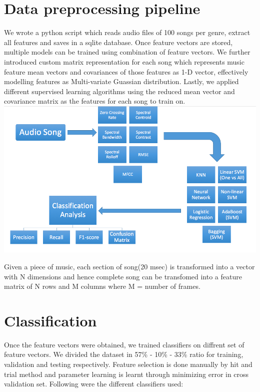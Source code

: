 \documentclass[conference]{IEEEtran}
\begin{document}


\section{Data preprocessing pipeline}
\label{sec:Data preprocessing}
We wrote a python script which reads audio files of 100 songs per genre, extract all features and saves in a sqlite database. Once feature vectors are stored, multiple models
can be trained using combination of feature vectors. We further introduced custom matrix representation for each song which represents music feature mean vectors and covariances
of those features as 1-D vector, effectively modelling features as Multi-variate Guassian distribution. Lastly, we applied different supervised learning algorithms
using the reduced mean vector and covariance matrix as the features for each song to train on.\\

\includegraphics[width=\columnwidth]{pipeline}

Given a piece of music, each section of song(20 msec) is transformed into a vector with N dimensions and hence complete song can be transfomed into a feature matrix of N rows
and M columns where M = number of frames.

\section{Classification}
Once the feature vectors were obtained, we trained classifiers on diffrent set of feature vectors. We divided the dataset in 57\% - 10\% - 33\% ratio for training, validation and testing respectively. Feature selection is done manually by hit and trial method and parameter learning is learnt through minimizing error in cross validation set. Following were the different classifiers used:
\end{document}
